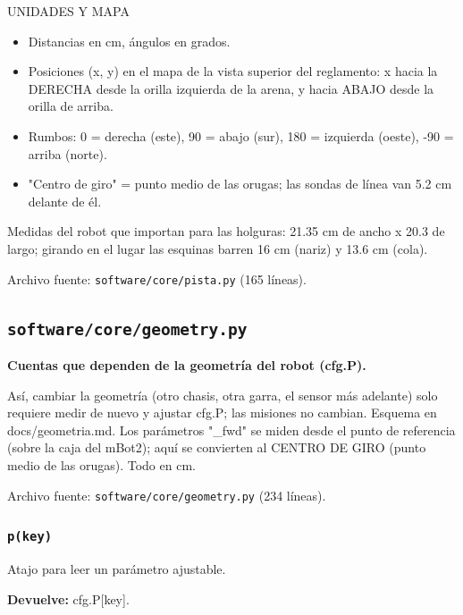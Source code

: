 UNIDADES Y MAPA

\begin{itemize}\setlength\itemsep{0pt}
\item Distancias en cm, ángulos en grados.
\item Posiciones (x, y) en el mapa de la vista superior del reglamento: x hacia la DERECHA desde la orilla izquierda de la arena, y hacia ABAJO desde la orilla de arriba.
\item Rumbos: 0 = derecha (este), 90 = abajo (sur), 180 = izquierda (oeste), -90 = arriba (norte).
\item "Centro de giro" = punto medio de las orugas; las sondas de línea van 5.2 cm delante de él.
\end{itemize}
Medidas del robot que importan para las holguras: 21.35 cm de ancho x 20.3 de largo; girando en el lugar las esquinas barren 16 cm (nariz) y 13.6 cm (cola).

\noindent Archivo fuente: \texttt{software/core/pista.py} (165 l\'ineas).

\subsection{\texttt{software/core/geometry.py}}\label{mod:geometry}
\textbf{Cuentas que dependen de la geometría del robot (cfg.P).}

Así, cambiar la geometría (otro chasis, otra garra, el sensor más adelante) solo requiere medir de nuevo y ajustar cfg.P; las misiones no cambian. Esquema en docs/geometria.md. Los parámetros "\_fwd" se miden desde el punto de referencia (sobre la caja del mBot2); aquí se convierten al CENTRO DE GIRO (punto medio de las orugas). Todo en cm.

\noindent Archivo fuente: \texttt{software/core/geometry.py} (234 l\'ineas).

\subsubsection{\texttt{p(key)}}\label{fn:geometry:p}
\noindent Atajo para leer un parámetro ajustable.

\par{}\par\smallskip
\noindent\textbf{Devuelve:} cfg.P[key].\par

